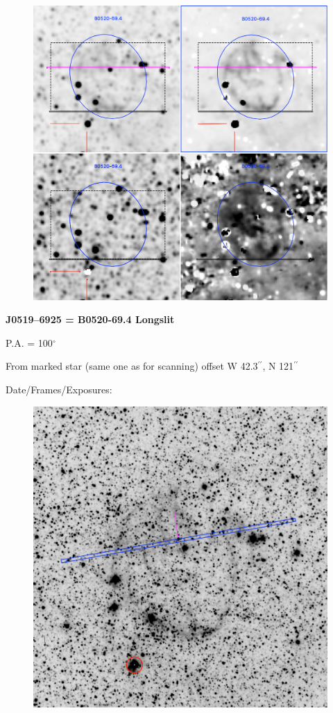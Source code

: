 \documentclass[11pt]{article}
\newcommand{\arcsec}{$^{\prime\prime}$}
\begin{document}
\begin{figure}
\includegraphics[width=12.5cm]{snapshots/B0520_694_5arcmin.png}
\end{figure}

\newpage
{\bf J0519--6925 = B0520-69.4 Longslit}
 
 P.A. = 100$^\circ$
 
From marked star (same one as for scanning)
offset W 42.3\arcsec, N 121\arcsec

Date/Frames/Exposures:


\begin{figure}
\includegraphics[width=12.5cm]{snapshots/B0520_longslit.png}
\end{figure}
\end{document}
